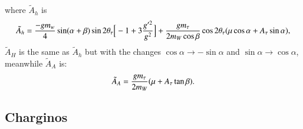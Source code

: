 \documentclass[final,3p,times,pdflatex]{elsarticle}
\begin{document}
where $\tilde{A}_h$ is
\begin{equation}
\begin{aligned}
\tilde{A}_h = {-g m_w \over 4} \sin(\alpha + \beta) \sin2\theta_{\tau}\Big[-1 + 3{g'^2 \over  g^2}\Big] + {g m_\tau \over 2 m_W \cos\beta}\cos2\theta_{\tau}(\mu\cos\alpha + A_\tau \sin\alpha),
\end{aligned}
\end{equation}
$\tilde{A}_H$ is the same as $\tilde{A}_h$ but with the changes $\cos\alpha \rightarrow -\sin\alpha$ and $\sin\alpha \rightarrow \cos\alpha$, meanwhile $\tilde{A}_A$ is:
\begin{equation}
\begin{aligned}
\tilde{A}_A = {g m_\tau \over 2 m_W} (\mu + A_\tau \tan\beta).
\end{aligned}
\end{equation}

\subsection{Charginos} \label{Charginos}
\end{document}
